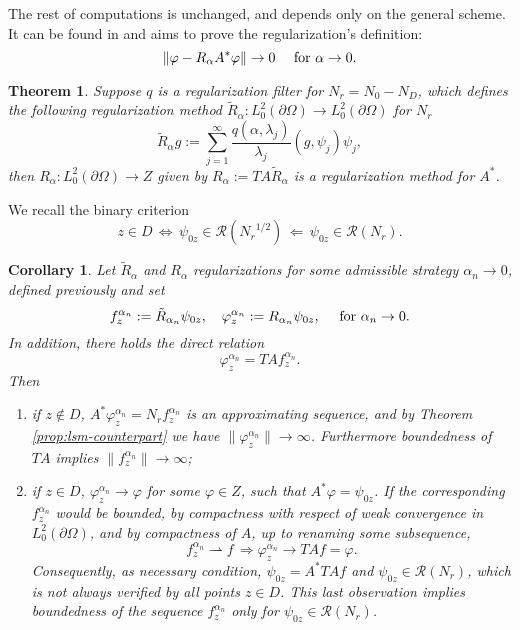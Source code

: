\documentclass[10pt, a4paper, twoside, openright]{book}
\theoremstyle{definition}
\theoremstyle{plain}
\newtheorem{theorem}[subsection]{Theorem}
\theoremstyle{plain}
\newtheorem{corollary}[subsection]{Corollary}
\theoremstyle{plain}
\theoremstyle{plain}
\theoremstyle{plain}
\theoremstyle{plain}
\theoremstyle{plain}
\theoremstyle{plain}
\let\phi\varphi
\begin{document}
The rest of computations is unchanged, and depends only on the general scheme. It can be found in \cite{arens:why} and aims to prove the regularization's definition:
\begin{equation}
 \|\phi - R_\alpha A^*\phi\|\to 0 \quad \textup{ for }\alpha\to 0.
\end{equation}
\begin{theorem}
 Suppose $q$ is a regularization filter for ${N_r} = {N_0}- {N_D}$, which defines the following regularization method $\tilde{R}_\alpha : L^2_0(\partial \Omega) \to L^2_0(\partial\Omega)$ for ${N_r}$
 \begin{equation}
  \tilde{R}_\alpha g := \sum_{j=1}^\infty\frac{q(\alpha,\lambda_j)}{\lambda_j}(g,\psi_j)\psi_j,
 \end{equation}
 then $R_\alpha : L^2_0(\partial\Omega) \to Z$  given by $R_\alpha:=TA\tilde{R}_\alpha$ is a regularization method for $A^*$.
\end{theorem}
We recall the binary criterion
\begin{equation}
 z\in D \,\Longleftrightarrow \, \psi_{0z}\in\mathcal{R}({N_r}^{1/2})\, \Longleftarrow \,\psi_{0z}\in\mathcal{R}({N_r}).
\end{equation}

\begin{corollary}
 Let $\tilde{R}_\alpha$ and $R_\alpha$ regularizations for some admissible strategy $\alpha_n\to 0$, defined previously and set
 \begin{equation}
  f_z^{\alpha_n}:=\tilde{R}_{\alpha_n}\psi_{0z},\quad \phi_z^{\alpha_n}:=R_{\alpha_n}\psi_{0z},\quad\textup{ for }\alpha_n \to 0.
 \end{equation}
 In addition, there holds the direct relation
 \begin{equation}
  \phi_z^{\alpha_n} = TAf_z^{\alpha_n}.
 \end{equation}
Then
\begin{enumerate}
 \item if $z\notin D$, $A^*\phi_z^{\alpha_n} = {N_r}f_z^{\alpha_n}$ is an 
 approximating sequence, and by Theorem \ref{prop:lsm-counterpart} we have $\|\phi_z^{\alpha_n}\|\to\infty$. Furthermore boundedness of $TA$ implies $\|f_z^{\alpha_n}\|\to\infty$;
 \item if $z \in D$, $\phi_z^{\alpha_n}\to \phi$ for some $\phi\in Z$, such that $A^*\phi = \psi_{0z}$. If the corresponding $f_z^{\alpha_n}$ would be bounded, by compactness with respect of weak convergence in $L^2_0(\partial\Omega)$, and by compactness of $A$, up to renaming some subsequence,
 \begin{equation}
  f_z^{\alpha_n}\rightharpoonup f \,\Rightarrow \phi_z^{\alpha_n} \to TA f = \phi.
 \end{equation}
Consequently, as necessary condition, $\psi_{0z}=A^*TAf$ and $\psi_{0z}\in\mathcal{R}({N_r})$, which is not always verified by all points $z\in D$.
This last observation implies boundedness of the sequence $f_z^{\alpha_n}$ only for $\psi_{0z}\in\mathcal{R}({N_r})$.
\end{enumerate}
\end{corollary}
\end{document}
